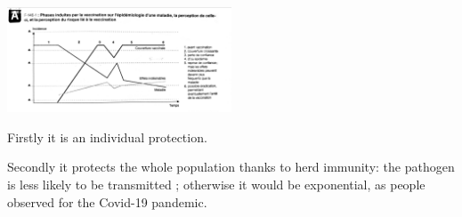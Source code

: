 \documentclass{article}
\begin{document}







        \begin{center}
            \includegraphics[width=0.5\textwidth, angle=90]{imgs/Perception.jpg} %
        \end{center}


            Firstly it is an individual protection.

            Secondly it protects the whole population thanks to herd immunity: the pathogen is less likely to be transmitted ; otherwise it would be exponential,
                as people observed for the Covid-19 pandemic.

  



\end{document}
